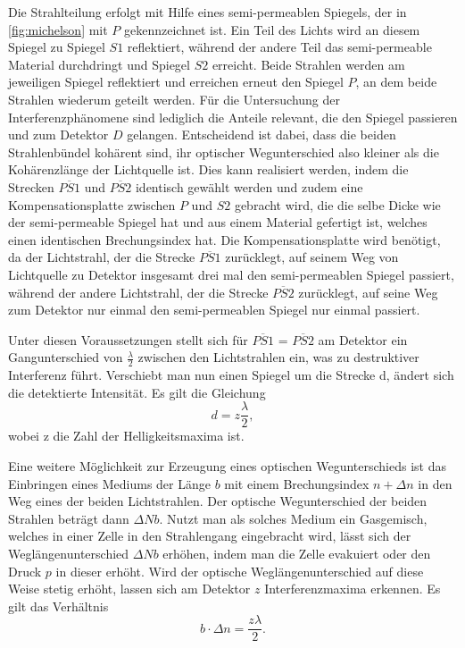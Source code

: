 Die Strahlteilung erfolgt mit Hilfe eines semi-permeablen Spiegels, der in \autoref{fig:michelson} mit $P$ gekennzeichnet
ist. Ein Teil des Lichts wird an diesem Spiegel zu Spiegel $S1$ reflektiert, während der andere Teil das semi-permeable 
Material durchdringt und Spiegel $S2$ erreicht. Beide Strahlen werden am jeweiligen Spiegel reflektiert und erreichen 
erneut den Spiegel $P$, an dem beide Strahlen wiederum geteilt werden. Für die Untersuchung der Interferenzphänomene sind
lediglich die Anteile relevant, die den Spiegel passieren und zum Detektor $D$ gelangen. Entscheidend ist dabei, dass
die beiden Strahlenbündel kohärent sind, ihr optischer Wegunterschied also kleiner als die Kohärenzlänge der Lichtquelle ist.
Dies kann realisiert werden, indem die Strecken $\overline{PS1}$ und $\overline{PS2}$ identisch gewählt werden und zudem eine
Kompensationsplatte zwischen $P$ und $S2$ gebracht wird, die die selbe Dicke wie der semi-permeable Spiegel hat und aus einem
Material gefertigt ist, welches einen identischen Brechungsindex hat. Die Kompensationsplatte wird benötigt, da der Lichtstrahl,
der die Strecke $\overline{PS1}$ zurücklegt, auf seinem Weg von Lichtquelle zu Detektor insgesamt drei mal den semi-permeablen
Spiegel passiert, während der andere Lichtstrahl, der die Strecke $\overline{PS2}$ zurücklegt, auf seine Weg zum Detektor nur einmal
den semi-permeablen Spiegel nur einmal passiert. 

Unter diesen Voraussetzungen stellt sich für $\overline{PS1}$ = $\overline{PS2}$ am Detektor ein Gangunterschied von $\frac{\lambda}{2}$ 
zwischen den Lichtstrahlen ein, was zu destruktiver Interferenz führt. Verschiebt man nun einen Spiegel um die Strecke
d, ändert sich die detektierte Intensität. Es gilt die Gleichung
\begin{equation}
    d = z \frac{\lambda}{2}, 
\end{equation}
wobei z die Zahl der Helligkeitsmaxima ist. 

Eine weitere Möglichkeit zur Erzeugung eines optischen Wegunterschieds ist das Einbringen eines Mediums der Länge $b$ mit einem 
Brechungsindex $n + \Delta n$ in den Weg eines der beiden Lichtstrahlen. Der optische Wegunterschied der beiden Strahlen
beträgt dann $\Delta N b$. Nutzt man als solches Medium ein Gasgemisch, welches in einer Zelle in den Strahlengang eingebracht
wird, lässt sich der Weglängenunterschied $\Delta N b$ erhöhen, indem man die Zelle evakuiert oder den Druck $p$ in dieser erhöht.
Wird der optische Weglängenunterschied auf diese Weise stetig erhöht, lassen sich am Detektor $z$ Interferenzmaxima erkennen.
Es gilt das Verhältnis
\begin{equation}
    b \cdot  \Delta n = \frac{z\lambda}{2} .
    \label{eqn:deltan}
\end{equation} 

